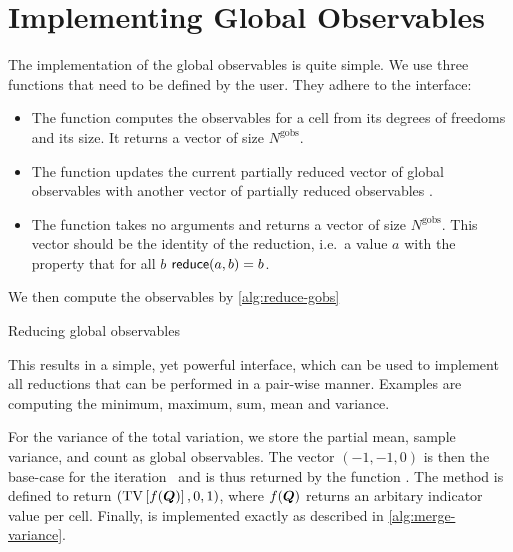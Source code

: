 \section{Implementing Global Observables}
\newcommand{\ngobs}{N^{\text{gobs}}}
The implementation of the global observables is quite simple.
We use three functions that need to be defined by the user.
They adhere to the interface:
\begin{itemize}
\item The function  computes the observables for a cell from its degrees of freedoms and its size.
  It returns a vector of size $\ngobs$.
\item The function  updates the current partially reduced vector of global observables  with another vector of partially reduced observables .
\item The function  takes no arguments and returns a vector of size $\ngobs$.
  This vector should be the identity of the reduction, i.e.\ a value $a$ with the property that for all $b$ $\textsf{reduce}(a, b) = b$.
\end{itemize}
We then compute the observables by \cref{alg:reduce-gobs}
\begin{algorithm}[htb]
  \begin{algorithmic}
    \EndFor{}
    \State{}
  \end{algorithmic}
  \caption{\label{alg:reduce-gobs}Reducing global observables}
\end{algorithm}
This results in a simple, yet powerful interface, which can be used to implement all reductions that can be performed in a pair-wise manner.
Examples are computing the minimum, maximum, sum, mean and variance.

For the variance of the total variation, we store the partial mean, sample variance, and count as global observables.
The vector $(-1, -1, 0)$ is then the base-case for the iteration~ and is thus returned by the function .
The method  is defined to return $\left( \operatorname{TV} \left[ f(\bm{Q}) \right], 0, 1 \right)$, where $f(\bm{Q})$ returns an arbitary indicator value per cell.
Finally,  is implemented exactly as described in \cref{alg:merge-variance}.

